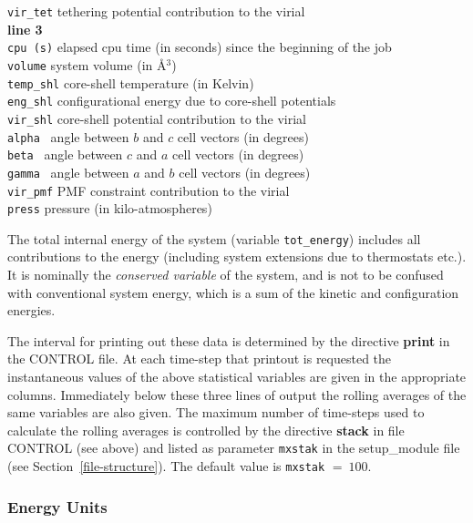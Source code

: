 \begin{tabbing}
\> {\tt vir\_tet}  \> tethering potential contribution to the virial \\
{\bf line 3} \\
\> {\tt cpu (s)}   \> elapsed cpu time (in seconds) since the beginning of the job \\
\> {\tt volume}    \> system volume (in \AA$^{3}$) \\
\> {\tt temp\_shl} \> core-shell temperature (in Kelvin) \\
\> {\tt eng\_shl}  \> configurational energy due to core-shell potentials \\
\> {\tt vir\_shl}  \> core-shell potential contribution to the virial \\
\> {\tt alpha }    \> angle between $b$ and $c$ cell vectors (in degrees) \\
\> {\tt beta }     \> angle between $c$ and $a$ cell vectors (in degrees) \\
\> {\tt gamma }    \> angle between $a$ and $b$ cell vectors (in degrees) \\
\> {\tt vir\_pmf}  \> PMF constraint contribution to the virial \\
\> {\tt press}     \> pressure (in kilo-atmospheres)
\end{tabbing}

 The total internal energy of the system
(variable {\tt tot\_energy}) includes all contributions to the
energy (including system extensions due to thermostats etc.).  It
is nominally the {\em conserved variable} of the system, and is
not to be confused with conventional system energy, which is a sum
of the kinetic and configuration energies.

The interval for printing out these data is determined by the
directive {\bf print} in the CONTROL file.  At each time-step that
printout is requested the instantaneous values of the above
statistical variables are given in the appropriate columns.
Immediately below these three lines of output the rolling averages
of the same variables are also given.  The maximum number of
time-steps used to calculate the rolling averages is controlled by
the directive {\bf stack} in file CONTROL (see above) and listed
as parameter {\tt mxstak} in the {\sc setup\_module} file (see
Section~\ref{file-structure}).  The default value is {\tt mxstak}
$=~100$.

\subsubsection*{Energy Units}

